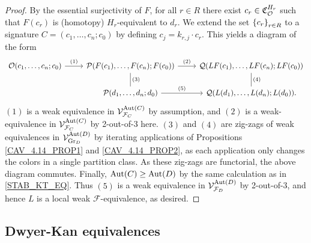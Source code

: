\documentclass[a4paper,10pt
,draft
]{article}%
\renewcommand{\F}{\mathcal F}
\newcommand{\Q}{\mathcal Q}
\renewcommand{\1}{\eta}%
\begin{document}
\begin{proof}
      By the essential surjectivity of $F$, for all $r \in R$ there exist $c_r \in \mathfrak C_{\mathcal{O}}^{H_r}$ such that
      $F(c_r)$ is (homotopy) $H_r$-equivalent to $d_r$.
      We extend the set $\left\{c_r\right\}_{r\in R}$ to a signature $C = (c_1,\ldots, c_n;c_0)$
      by defining $c_j = k_{r,j} \cdot c_r$.
      This yields a diagram of the form
      \begin{equation}
            \label{TWOOFTHREE_EQ}
            \begin{tikzcd}
                  \O(c_1,\ldots, c_n;c_0) \arrow[r, "(1)"]
                  &
                  \P(F(c_1),\ldots, F(c_n); F(c_0)) \arrow[d,dash, "(3)"] \arrow[r, "(2)"]
                  &
                  \Q(LF(c_1),\ldots, LF(c_n);LF(c_0)) \arrow[d, dash, "(4)"]
                  \\
                  &
                  \P(d_1,\ldots, d_n;d_0) \arrow[r, "(5)"]
                  &
                  \Q(L(d_1),\ldots, L(d_n); L(d_0)).
            \end{tikzcd}
      \end{equation}
      $(1)$ is a weak equivalence in $\V^{\Aut(C)}_{\F_C}$ by assumption, and
      $(2)$ is a weak-equivalence in $\V^{\Aut(C)}_{\F_C}$ by 2-out-of-3 here.
      $(3)$ and $(4)$ are zig-zags of weak equivalences in $\mathcal V^{\operatorname{Aut}(D)}_{\mathrm{Gr}_D}$ by iterating applications of
      Propositions \ref{CAV_4.14_PROP1} and \ref{CAV_4.14_PROP2},
      as each application only changes the colors in a single partition class.
      As these zig-zags are functorial, the above diagram commutes.
      Finally, $\operatorname{Aut}(C) \geq \operatorname{Aut}(D)$ by the same calculation as in \eqref{STAB_KT_EQ}.
      Thus $(5)$ is a weak equivalence in $\V^{\Aut(D)}_{\F_D}$ by 2-out-of-3, and hence
      $L$ is a local weak $\F$-equivalence, as desired.
\end{proof}




\subsection{Dwyer-Kan equivalences}
\label{DK_SEC}
\end{document}
